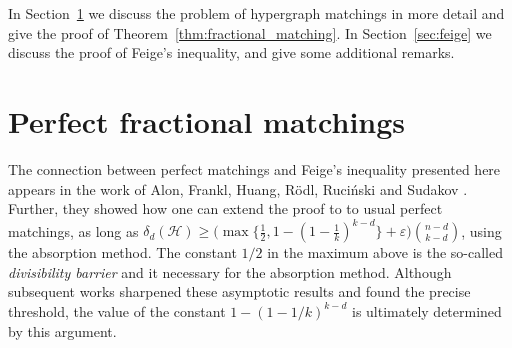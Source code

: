 \documentclass[10pt,a4paper]{article}
\newcommand{\cH}{\mathcal{H}}
\begin{document}
In Section~\ref{sec:matchings} we discuss the problem of hypergraph matchings in more detail and give the proof of Theorem~\ref{thm:fractional_matching}. In Section~\ref{sec:feige} we discuss the proof of Feige's inequality, and give some additional remarks.

\section{Perfect fractional matchings}\label{sec:matchings}

The connection between perfect matchings and Feige's inequality presented here appears in the work of Alon, Frankl, Huang, R\"odl, Ruci\'nski and Sudakov \cite{AFHRRS12}. Further, they showed how one can extend the proof to to usual perfect matchings, as long as $\delta_d(\cH)\geq \big(\max\{\frac{1}{2}, 1-(1-\frac{1}{k})^{k-d}\}+\varepsilon\big)\binom{n-d}{k-d}$, using the absorption method. The constant $1/2$ in the maximum above is the so-called \textit{divisibility barrier} and it necessary for the absorption method. Although subsequent works \cite{CLZ26,HLWY26,TZ13} sharpened these asymptotic results and found the precise threshold, the value of the constant $1-(1-1/k)^{k-d}$ is ultimately determined by this argument.
\end{document}
